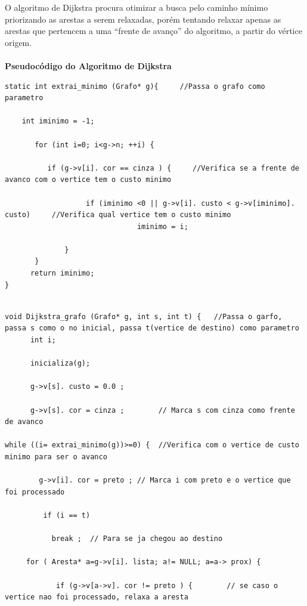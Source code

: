 \documentclass[11pt]{article} %
\begin{document}
\begin{enumerate}[a)]
\vspace*{0.5cm}
\hspace*{1cm} O algoritmo de Dijkstra procura otimizar a busca pelo caminho mínimo priorizando as arestas a serem relaxadas, porém tentando relaxar apenas as arestas que pertencem a uma “frente de avanço” do algoritmo, a partir do vértice origem. \\ \\

{\bf Pseudocódigo do Algoritmo de Dijkstra}

\begin{lstlisting}
static int extrai_minimo (Grafo* g){ 	 //Passa o grafo como parametro

    int iminimo = -1;

       for (int i=0; i<g->n; ++i) {

          if (g->v[i]. cor == cinza ) { 	//Verifica se a frente de avanco com o vertice tem o custo minimo

                   if (iminimo <0 || g->v[i]. custo < g->v[iminimo]. custo) 	//Verifica qual vertice tem o custo minimo
                               iminimo = i;

              }
       }
      return iminimo;
}

\end{lstlisting}

\newpage

\begin{lstlisting}

void Dijkstra_grafo (Grafo* g, int s, int t) { 	 //Passa o garfo, passa s como o no inicial, passa t(vertice de destino) como parametro
      int i;

      inicializa(g);

      g->v[s]. custo = 0.0 ;

      g->v[s]. cor = cinza ; 		// Marca s com cinza como frente de avanco

while ((i= extrai_minimo(g))>=0) { 	//Verifica com o vertice de custo minimo para ser o avanco

        g->v[i]. cor = preto ; // Marca i com preto e o vertice que foi processado

         if (i == t)

           break ; 	// Para se ja chegou ao destino

     for ( Aresta* a=g->v[i]. lista; a!= NULL; a=a-> prox) {

            if (g->v[a->v]. cor != preto ) { 		// se caso o vertice nao foi processado, relaxa a aresta


\end{lstlisting}
\end{enumerate}
\end{document}
